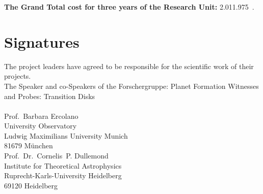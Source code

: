 \documentclass[10pt,fleqn,twoside,a4paper]{article}
\begin{document}
\begin{Emphasize}
{\bf The Grand Total cost for three years of the Research Unit:} \hfill 2.011.975~\EUR{}.
\end{Emphasize}
\newpage
%

\section{Signatures}
%
The project leaders have agreed to be responsible for the scientific
work of their projects.\\[0.4cm]
%
\noindent
The Speaker and co-Speakers of the Forschergruppe: Planet Formation
Witnesses and Probes: Transition Disks\\[0.4cm]
% 
\noindent
{\it }
\\[1.0cm]
%
% 
\noindent
Prof.\ Barbara Ercolano \\
University Observatory \\
Ludwig Maximilians University Munich\\
81679  M\"unchen\vspace{1em}\\

\noindent Prof.\ Dr.\ Cornelis~P. Dullemond\\
Institute for Theoretical Astrophysics\\
Ruprecht-Karls-University Heidelberg\\
69120 Heidelberg\vspace{1em}\\
\end{document}
